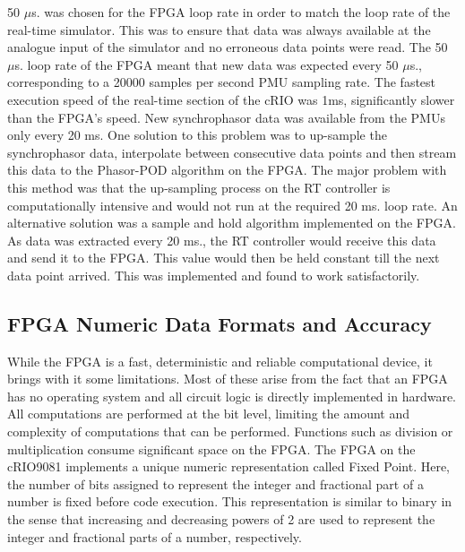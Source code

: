 \documentclass[journal]{IEEEtran}
\begin{document}
50 $\mu$s. was chosen for the FPGA loop rate in order to match the loop rate of the real-time simulator. This was to ensure that data was always available at the analogue input of the simulator and no erroneous data points were read. The 50 $\mu$s. loop rate of the FPGA meant that new data was expected every 50 $\mu$s., corresponding to a 20000 samples per second PMU sampling rate. The fastest execution speed of the real-time section of the cRIO was 1ms, significantly slower than the FPGA\rq{s} speed. New synchrophasor data was available from the PMUs only every 20 ms. One solution to this problem was to up-sample the synchrophasor data, interpolate between consecutive data points and then stream this data to the Phasor-POD algorithm on the FPGA. The major problem with this method was that the up-sampling process on the RT controller is computationally intensive and would not run at the required 20 ms. loop rate. An alternative solution was a sample and hold algorithm implemented on the FPGA. As data was extracted every 20 ms., the RT controller would receive this data and send it to the FPGA. This value would then be held constant till the next data point arrived. This was implemented and found to work satisfactorily. %

\subsection{FPGA Numeric Data Formats and Accuracy}

While the FPGA is a fast, deterministic and reliable computational device, it brings with it some limitations. Most of these arise from the fact that an FPGA has no operating system and all circuit logic is directly implemented in hardware. All computations are performed at the bit level, limiting the amount and complexity of computations that can be performed. Functions such as division or multiplication consume significant space on the FPGA\cite{LabViewManuals}. The FPGA on the cRIO9081 implements a unique numeric representation called Fixed Point\cite{LabViewManuals}. Here, the number of bits assigned to represent the integer and fractional part of a number is fixed before code execution\cite{LabViewManuals}. This representation is similar to binary in the sense that increasing and decreasing powers of 2 are used to represent the integer and fractional parts of a number, respectively.
\end{document}
